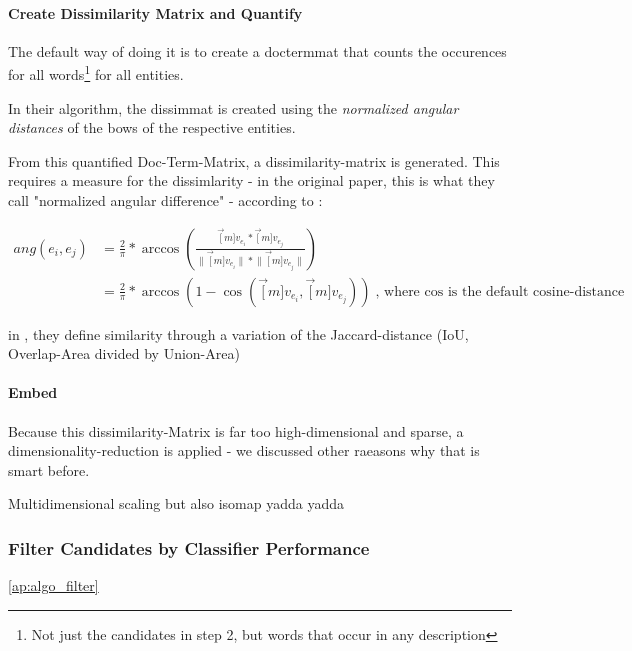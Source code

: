 \paragraph{Create Dissimilarity Matrix and Quantify}

The default way of doing it is to create a \gls{doctermmat} that counts the occurences for all words\footnote{Not just the candidates in step 2, but words that occur in any description} for all entities.

In their algorithm, the \gls{dissimmat} is created using the \emph{normalized angular distances} of the \glspl{bow} of the respective entities.  

From this quantified Doc-Term-Matrix, a dissimilarity-matrix is generated. This requires a measure for the dissimlarity - in the original paper, this is what they call "normalized angular difference" - according to \cite{Derrac2015}:

\begin{align}
	ang(e_i, e_j) &= \frac{2}{\pi} * \arccos \left( \frac{\vec[m]{v_{e_i}} * \vec[m]{v_{e_j}}} { \lVert \vec[m]{v_{e_i}} \rVert * \lVert \vec[m]{v_{e_j}} \rVert }  \right)  \label{eq:norm_ang_dist} \\
	&= \frac{2}{\pi} * \arccos(1-\cos(\vec[m]{v_{e_i}},\vec[m]{v_{e_j}})) \text{, where $\cos$ is the default cosine-distance} \nonumber
\end{align}

in \cite{Schockaert2011}, they define similarity through a variation of the Jaccard-distance (IoU, Overlap-Area divided by Union-Area)

\paragraph{Embed}

Because this dissimilarity-Matrix is far too high-dimensional and sparse, a dimensionality-reduction is applied - we discussed other raeasons why that is smart before.

Multidimensional scaling but also isomap yadda yadda


\subsubsection{Filter Candidates by Classifier Performance}
\label{sec:svm_filter_cands}

\autoref{ap:algo_filter}

